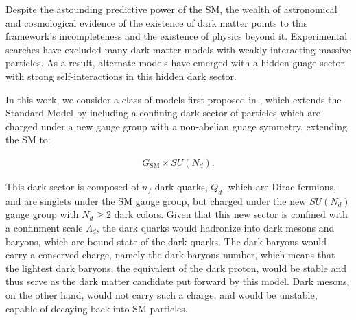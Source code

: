 %

Despite the astounding predictive power of the SM, the wealth of astronomical and cosmological evidence of the existence of dark matter points to this framework's incompleteness and the existence of physics beyond it. Experimental searches have excluded many dark matter models with weakly interacting massive particles. As a result, alternate models have emerged with a hidden guage sector with strong self-interactions in this hidden dark sector.

In this work, we consider a class of models first proposed in \cite{schwallerEmergingJets2015}, which extends the Standard Model by including a confining dark sector of particles which are charged under a new gauge group with a non-abelian guage symmetry, extending the SM to:

\begin{equation}
	\begin{aligned}
		G_{\text{SM}} \times SU(N_d).
	\end{aligned}
\end{equation}

This dark sector is composed of $n_f$ dark quarks, $Q_d$, which are Dirac fermions, and are singlets under the SM gauge group, but charged under the new $SU(N_d)$ gauge group with $N_d \geq 2$ dark colors. Given that this new sector is confined with a confinment scale $\Lambda_d$, the dark quarks would hadronize into dark mesons and baryons, which are bound state of the dark quarks. The dark baryons would carry a conserved charge, namely the dark baryons number, which means that the lightest dark baryons, the equivalent of the dark proton, would be stable and thus serve as the dark matter candidate put forward by this model. Dark mesons, on the other hand, would not carry such a charge, and would be unstable, capable of decaying back into SM particles.

